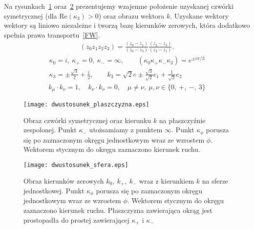 Na rysunkach~\ref{dwustosunek_plaszczyzna} oraz~\ref{dwustosunek_sfera} 
prezentujemy wzajemne położenie 
uzyskanej czwórki symetrycznej (dla Re$ (\kappa_3) >0$) 
oraz obrazu wektora $k$. 
Uzyskane wektory wektory są liniowo niezależne i tworzą bazę 
kierunków zerowych, która dodatkowo spełnia 
prawa transportu~\eqref{FW}.
\begin{align}\label{dwustosunek_definicja}
(z_0z_1z_2z_3) = 
\frac{(z_0-z_1)}{(z_0-z_3)} 
\frac{(z_2-z_3)}{(z_2 -z_1)} .
\end{align}
\begin{align}\label{dwustosunek_kappa}
\kappa_0 = i,\ \kappa_+ = 0,\ \kappa_-=\infty,
\qquad (\kappa_0\kappa_+\kappa_-\kappa_3)
 = e^{\pm i\pi/3} \\ \label{kappa3_wynikPM}
\kappa_3 =\pm  \frac{\sqrt{3}}{2} + \frac{i}{2}, \qquad
k_3 = \sqrt{2} e\pm \frac{\sqrt{3}}{\sqrt{2}}e_1+ \frac{1}{\sqrt{2}} e_2
\end{align}
\begin{align*}
k_\mu \cdot k_\nu = 1 , 
\quad k_\nu \cdot k_\nu = 0,\quad \mu \neq \nu ,\ 
\mu,\nu \in \{0,\ +,\ -,\ 3\}
\end{align*}
\begin{figure}
\centering
\texttt{[image: dwustosunek\_plaszczyzna.eps]}
\caption{Obraz czwórki symetrycznej oraz kierunku $k$ na płaszczyźnie 
zespolonej.
Punkt $\kappa_- $ utożsamiamy z punktem $\infty$.
Punkt $\kappa_\phi$ porusza się po zaznaczonym okręgu jednostkowym 
wraz ze wzrostem $\phi$. Wektorem stycznym do okręgu zaznaczono 
kierunek ruchu.}
\label{dwustosunek_plaszczyzna}
\end{figure}
\begin{figure}
\centering
\texttt{[image: dwustosunek\_sfera.eps]}
\caption{Obraz kierunków zerowych $k_0,\ k_+,\ k_-$ wraz z kierunkiem $k$
na sferze jednostkowej. 
Punkt $\kappa_\phi$ porusza się po zaznaczonym okręgu jednostkowym 
wraz ze wzrostem $\phi$. Wektorem stycznym do okręgu zaznaczono kierunek 
ruchu.
Płaszczyzna zawierająca okrąg jest prostopadła do prostej zawierającej 
$\kappa_+$ i $\kappa_-$}
\label{dwustosunek_sfera}
\end{figure}
\newpage

